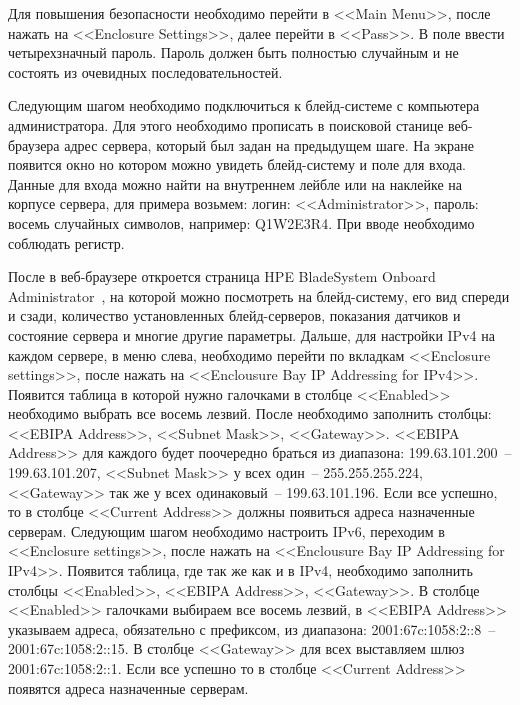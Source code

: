 Для повышения безопасности необходимо перейти в <<Main Menu>>, после нажать на <<Enclosure Settings>>, далее перейти в <<Pass>>. В поле ввести четырехзначный пароль. Пароль должен быть полностью случайным и не состоять из очевидных последовательностей.

Следующим шагом необходимо подключиться к блейд-системе с компьютера администратора. Для этого необходимо прописать в поисковой станице веб-браузера адрес сервера, который был задан на предыдущем шаге. На экране появится окно но котором можно увидеть блейд-систему и поле для входа. Данные для входа можно найти на внутреннем лейбле или на наклейке на корпусе сервера, для примера возьмем: логин: <<Administrator>>, пароль: восемь случайных символов, например: Q1W2E3R4. При вводе необходимо соблюдать регистр. 

После в веб-браузере откроется страница HPE BladeSystem Onboard Administrator~\cite{configuration_blade_systeb}, на которой можно посмотреть на блейд-систему, его вид спереди и сзади, количество установленных блейд-серверов, показания датчиков и состояние сервера и многие другие параметры. Дальше, для настройки IPv4 на каждом сервере, в меню слева, необходимо перейти по вкладкам <<Enclosure settings>>, после нажать на <<Enclousure Bay IP Addressing for IPv4>>. Появится таблица в которой нужно галочками в столбце <<Enabled>> необходимо выбрать все восемь лезвий. После необходимо заполнить столбцы: <<EBIPA Address>>, <<Subnet Mask>>, <<Gateway>>. <<EBIPA Address>> для каждого будет поочередно браться из диапазона: 199.63.101.200~-- 199.63.101.207, <<Subnet Mask>> у всех один~-- 255.255.255.224, <<Gateway>> так же у всех одинаковый~-- 199.63.101.196. Если все успешно, то в столбце <<Current Address>> должны появиться адреса назначенные серверам. Следующим шагом необходимо настроить IPv6, переходим в <<Enclosure settings>>, после нажать на <<Enclousure Bay IP Addressing for IPv4>>. Появится таблица, где так же как и в IPv4, необходимо заполнить столбцы <<Enabled>>, <<EBIPA Address>>, <<Gateway>>. В столбце <<Enabled>> галочками выбираем все восемь лезвий, в <<EBIPA Address>> указываем адреса, обязательно с префиксом, из диапазона: 2001:67c:1058:2::8~-- 2001:67c:1058:2::15. В столбце <<Gateway>> для всех выставляем шлюз 2001:67c:1058:2::1. Если все успешно то в столбце <<Current Address>> появятся адреса назначенные серверам.

